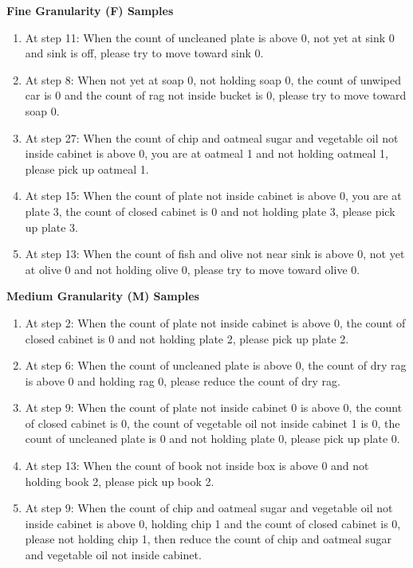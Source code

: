 \begin{table}[ht]
\centering
\begin{minipage}{\textwidth}

\noindent\textbf{Fine Granularity (F) Samples}
\begin{tcolorbox}[colback=green!5, colframe=green!40!black]
\small
\begin{enumerate}
    \item At step 11: When the count of uncleaned plate is above 0, not yet at sink 0 and sink is off, please try to move toward sink 0.
    \item At step 8: When not yet at soap 0, not holding soap 0, the count of unwiped car is 0 and the count of rag not inside bucket is 0, please try to move toward soap 0.
    \item At step 27: When the count of chip and oatmeal sugar and vegetable oil not inside cabinet is above 0, you are at oatmeal 1 and not holding oatmeal 1, please pick up oatmeal 1.
    \item At step 15: When the count of plate not inside cabinet is above 0, you are at plate 3, the count of closed cabinet is 0 and not holding plate 3, please pick up plate 3.
    \item At step 13: When the count of fish and olive not near sink is above 0, not yet at olive 0 and not holding olive 0, please try to move toward olive 0.
\end{enumerate}
\end{tcolorbox}

\noindent\textbf{Medium Granularity (M) Samples}
\begin{tcolorbox}[colback=yellow!5, colframe=yellow!40!black]
\small
\begin{enumerate}
    \item At step 2: When the count of plate not inside cabinet is above 0, the count of closed cabinet is 0 and not holding plate 2, please pick up plate 2.
    \item At step 6: When the count of uncleaned plate is above 0, the count of dry rag is above 0 and holding rag 0, please reduce the count of dry rag.
    \item At step 9: When the count of plate not inside cabinet 0 is above 0, the count of closed cabinet is 0, the count of vegetable oil not inside cabinet 1 is 0, the count of uncleaned plate is 0 and not holding plate 0, please pick up plate 0.
    \item At step 13: When the count of book not inside box is above 0 and not holding book 2, please pick up book 2.
    \item At step 9: When the count of chip and oatmeal sugar and vegetable oil not inside cabinet is above 0, holding chip 1 and the count of closed cabinet is 0, please not holding chip 1, then reduce the count of chip and oatmeal sugar and vegetable oil not inside cabinet.
\end{enumerate}
\end{tcolorbox}


\end{minipage}
\end{table}
